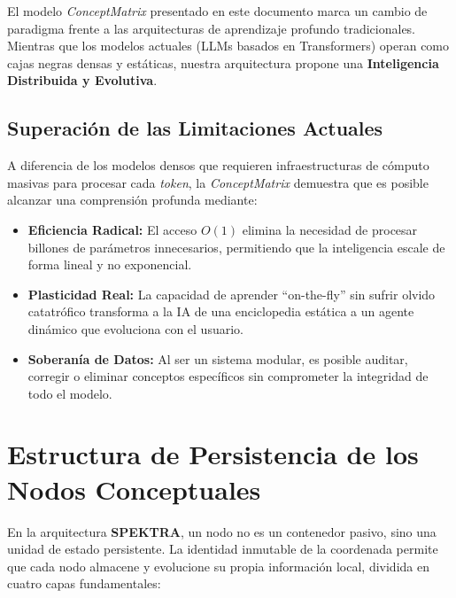\documentclass[12pt]{article}
\begin{document}
El modelo \textit{ConceptMatrix} presentado en este documento marca un cambio de paradigma frente a las arquitecturas de aprendizaje profundo tradicionales. Mientras que los modelos actuales (LLMs basados en Transformers) operan como cajas negras densas y estáticas, nuestra arquitectura propone una \textbf{Inteligencia Distribuida y Evolutiva}.

\subsection{Superación de las Limitaciones Actuales}
A diferencia de los modelos densos que requieren infraestructuras de cómputo masivas para procesar cada \textit{token}, la \textit{ConceptMatrix} demuestra que es posible alcanzar una comprensión profunda mediante:
\begin{itemize}
    \item \textbf{Eficiencia Radical:} El acceso $O(1)$ elimina la necesidad de procesar billones de parámetros innecesarios, permitiendo que la inteligencia escale de forma lineal y no exponencial.
    \item \textbf{Plasticidad Real:} La capacidad de aprender ``on-the-fly'' sin sufrir olvido catatrófico transforma a la IA de una enciclopedia estática a un agente dinámico que evoluciona con el usuario.
    \item \textbf{Soberanía de Datos:} Al ser un sistema modular, es posible auditar, corregir o eliminar conceptos específicos sin comprometer la integridad de todo el modelo.
\end{itemize}



\section{Estructura de Persistencia de los Nodos Conceptuales}

En la arquitectura \textbf{SPEKTRA}, un nodo no es un contenedor pasivo, sino una unidad de estado persistente. La identidad inmutable de la coordenada permite que cada nodo almacene y evolucione su propia información local, dividida en cuatro capas fundamentales:
\end{document}
